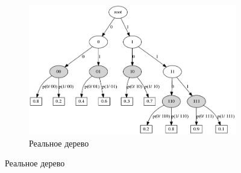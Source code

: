\documentclass{matmex-diploma-custom}
\begin{document}
\begin{figure}[h!]\centering
\begin{subfigure}[b]{0.49 \textwidth}
	\includegraphics[scale=0.3]{img/sample/real_trie_.png}
	\centering
	\caption{ Реальное дерево }
	\label{fig:sample_vlhmm_real_trie}
	

\end{subfigure}
\end{figure}
\end{document}
